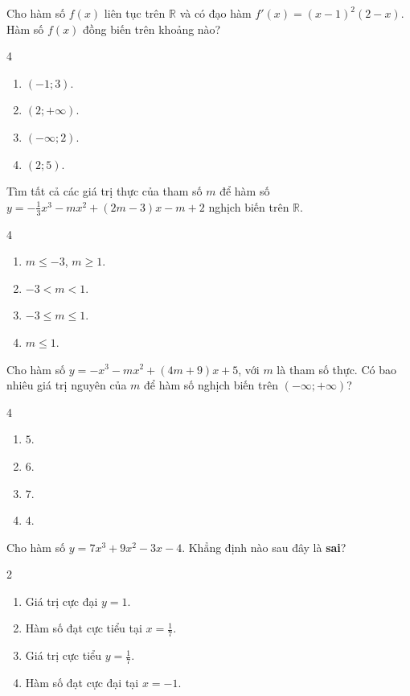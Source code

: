 \begin{baitap}
	Cho hàm số $f(x)$ liên tục trên $ \mathbb{R} $ và có đạo hàm $f'(x)=(x-1)^2(2-x)$. Hàm số $f(x)$ đồng biến trên khoảng nào?
	\begin{multicols}{4}
		\begin{enumerate}[\quad \bf A.]
			\item $(-1;3)$.
			\item $(2;+\infty)$.
			\item $(-\infty;2)$.
			\item $(2;5)$.
		\end{enumerate}
	\end{multicols}
\end{baitap}
\begin{baitap}
	Tìm tất cả các giá trị thực của tham số $m$ để hàm số $y = -\frac{1}{3}x^3 - mx^2 + (2m - 3)x - m + 2$ nghịch biến trên $\mathbb{R}$.
	\begin{multicols}{4}
		\begin{enumerate}[\quad \bf A.]
			\item $m \le -3$, $m \ge 1$.
			\item $-3 < m < 1$.
			\item $-3 \le m \le 1$.
			\item $m \le 1$.
		\end{enumerate}
	\end{multicols}
\end{baitap}

\begin{baitap}
	Cho hàm số $y = -x^3 - mx^2 + (4m + 9)x + 5$, với $m$ là tham số thực. Có bao nhiêu giá trị nguyên của $m$ để hàm số nghịch biến trên $(-\infty; +\infty)$?
	\begin{multicols}{4}
		\begin{enumerate}[\quad \bf A.]
			\item $5$.
			\item $6$.
			\item $7$.
			\item $4$.
		\end{enumerate}
	\end{multicols}
\end{baitap}

\begin{baitap}
	Cho hàm số $y = 7x^3 + 9x^2 - 3x - 4$. Khẳng định nào sau đây là \textbf{sai}?
	\begin{multicols}{2}
		\begin{enumerate}[\quad \bf A.]
			\item Giá trị cực đại $y = 1$.
			\item Hàm số đạt cực tiểu tại $x = \frac{1}{7}$.
			\item Giá trị cực tiểu $y = \frac{1}{7}$.
			\item Hàm số đạt cực đại tại $x = -1$.
		\end{enumerate}
	\end{multicols}
\end{baitap}

